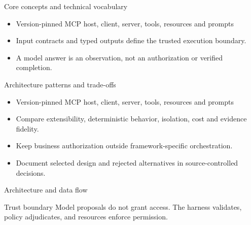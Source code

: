 \documentclass[aspectratio=169,10pt]{beamer}
\begin{document}
\begin{frame}{Core concepts and technical vocabulary}
\small
\begin{itemize}
\item Version-pinned MCP host, client, server, tools, resources and prompts
\item Input contracts and typed outputs define the trusted execution boundary.
\item A model answer is an observation, not an authorization or verified completion.
\end{itemize}

\end{frame}

\begin{frame}{Architecture patterns and trade-offs}
\small
\begin{itemize}
\item Version-pinned MCP host, client, server, tools, resources and prompts
\item Compare extensibility, deterministic behavior, isolation, cost and evidence fidelity.
\item Keep business authorization outside framework-specific orchestration.
\item Document selected design and rejected alternatives in source-controlled decisions.
\end{itemize}

\end{frame}

\begin{frame}{Architecture and data flow}
\small
\centering
{}
\vspace{0.6cm}
\begin{block}{Trust boundary}
Model proposals do not grant access. The harness validates, policy adjudicates, and resources enforce permission.
\end{block}
\end{frame}
\end{document}
